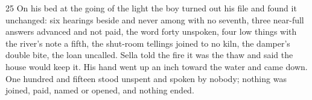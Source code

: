 \begin{CRchronicle}{25}
On his bed at the going of the light the boy turned out his file and found it unchanged: six hearings beside and never among with no seventh, three near-full answers advanced and not paid, the word forty unspoken, four low things with the river’s note a fifth, the shut-room tellings joined to no kiln, the damper’s double bite, the loan uncalled. Sella told the fire it was the thaw and said the house would keep it. His hand went up an inch toward the water and came down. One hundred and fifteen stood unspent and spoken by nobody; nothing was joined, paid, named or opened, and nothing ended.
\end{CRchronicle}
